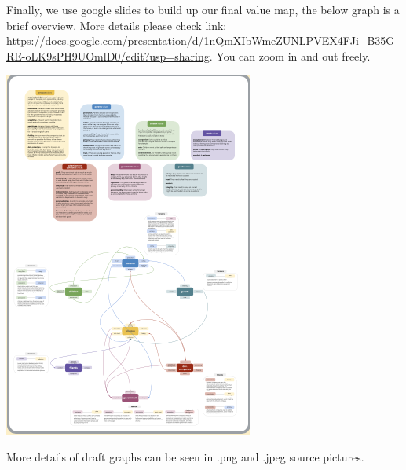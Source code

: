 \documentclass{article}
\begin{document}
Finally, we use google slides to build up our final value map, the below graph is a brief overview. More details please check link: \href{https://docs.google.com/presentation/d/1nQmXIbWmeZUNLPVEX4FJi_B35GRE-oLK9sPH9UOmlD0/edit?usp=sharing}{\url{https://docs.google.com/presentation/d/1nQmXIbWmeZUNLPVEX4FJi_B35GRE-oLK9sPH9UOmlD0/edit?usp=sharing}}. You can zoom in and out freely.

\includegraphics[scale=2]{final_value_map.png}

More details of draft graphs can be seen in .png and .jpeg source pictures.
\end{document}
